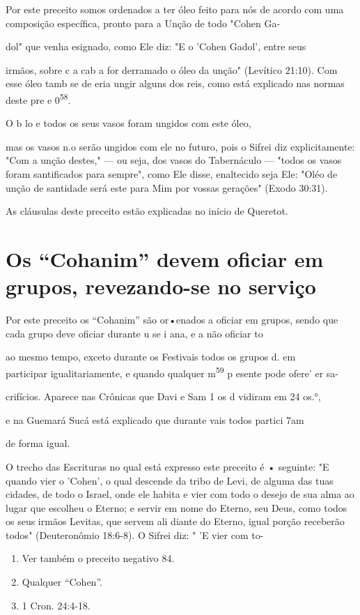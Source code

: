 Por este preceito somos ordenados a ter óleo feito para nós de acor­do
com uma composição específica, pronto para a Unção de todo "Cohen Ga-

dol" que venha esignado, como Ele diz: "E o 'Cohen Gadol', entre seus

irmãos, sobre c a cab a for derramado o óleo da unção" (Levítico 21:10).
Com esse óleo tamb se de eria ungir alguns dos reis, como está explicado
nas nor­mas deste pre e 0\textsuperscript{58}.

O b lo e todos os seus vasos foram ungidos com este óleo,

mas os vasos n.o serão ungidos com ele no futuro, pois
o Sifrei diz explicita­mente: "Com a unção destes," --- ou seja, dos
vasos do Tabernáculo --- "todos os vasos foram santificados para
sempre", como Ele disse, enaltecido seja Ele: "Oléo de unção de
santidade será este para Mim por vossas gerações" (Exodo 30:31).


As cláusulas deste preceito estão explicadas no início de Queretot.


\section{Os ``Cohanim'' devem oficiar em grupos, revezando-se no serviço}

Por este preceito os ``Cohanim'' são or•enados a oficiar em grupos, sendo
que cada grupo deve oficiar durante u se i ana, e a não oficiar to

ao mesmo tempo, exceto durante os Festivais todos os grupos d. em\\
participar igualitariamente, e quando qualquer m\textsuperscript{59} p
esente pode ofere' er sa-

crifícios. Aparece nas Crônicas que Davi e Sam 1 os d vidiram em 24
os.°,

e na Guemará Sucá está explicado que durante vais todos partici 7am

de forma igual.

O trecho das Escrituras no qual está expresso este preceito é •
se­guinte: "E quando vier o 'Cohen', o qual descende da tribo de Levi,
de alguma das tuas cidades, de todo o Israel, onde ele habita e vier com
todo o desejo de sua alma ao lugar que escolheu o Eterno; e servir em
nome do Eterno, seu Deus, como todos os seus irmãos Levitas, que servem
ali diante do Eterno, igual porção receberão todos" (Deuteronômio
18:6-8). O Sifrei diz: " 'E vier com to-


\begin{enumerate}
\def\labelenumi{\arabic{enumi}.}
\setcounter{enumi}{57}
\item
 
 Ver também o preceito negativo 84.
 
\item
 
 Qualquer ``Cohen''.
 
\item
 
 1 Cron. 24:4-18.
 
\end{enumerate}




